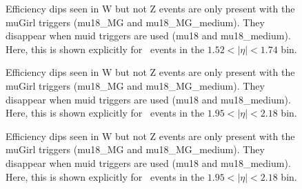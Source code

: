 \begin{figure}[phtb]
  \begin{center}
 \caption{ Efficiency dips seen in W but not Z events are only present with the muGirl triggers (mu18\_MG and mu18\_MG\_medium). They disappear when muid triggers are used (mu18 and mu18\_medium). Here, this is shown explicitly for \Wplus\ events in the $1.52<|\eta|<1.74$ bin. }
 \label{fig:Wmunu:AC_mu18_POS_8}
 \end{center}
\end{figure}

\begin{figure}[phtb]
  \begin{center}
 \caption{ Efficiency dips seen in W but not Z events are only present with the muGirl triggers (mu18\_MG and mu18\_MG\_medium). They disappear when muid triggers are used (mu18 and mu18\_medium). Here, this is shown explicitly for \Wminus\ events in the $1.95<|\eta|<2.18$ bin. }
 \label{fig:Wmunu:AC_mu18_NEG_10}
 \end{center}
\end{figure}

\begin{figure}[phtb]
  \begin{center}
 \caption{ Efficiency dips seen in W but not Z events are only present with the muGirl triggers (mu18\_MG and mu18\_MG\_medium). They disappear when muid triggers are used (mu18 and mu18\_medium). Here, this is shown explicitly for \Wplus\ events in the $1.95<|\eta|<2.18$ bin. }
 \label{fig:Wmunu:AC_mu18_POS_10}
 \end{center}
\end{figure}

